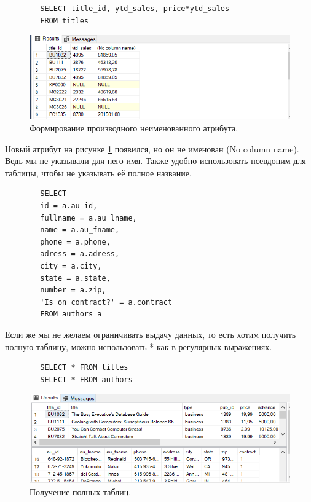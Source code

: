 \begin{verbatim}
        SELECT title_id, ytd_sales, price*ytd_sales
        FROM titles
\end{verbatim}
\begin{figure}
    \centering
    \includegraphics[width=0.9\linewidth]{Pic/lab4/SQL6.PNG}
    \caption{Формирование производного неименованного атрибута.}
    \label{fig:CatribNo}
\end{figure}

Новый атрибут на рисунке \ref{fig:CatribNo} появился, но он не именован (No column name). Ведь мы не указывали для него имя. Также удобно использовать псевдоним для таблицы, чтобы не указывать её полное название.

\begin{verbatim}
        SELECT 
        id = a.au_id, 
        fullname = a.au_lname, 
        name = a.au_fname,
        phone = a.phone,
        adress = a.adress,
        city = a.city,
        state = a.state,
        number = a.zip,
        'Is on contract?' = a.contract
        FROM authors a
\end{verbatim}

Если же мы не желаем ограничивать выдачу данных, то есть хотим получить полную таблицу, можно использовать * как в регулярных выражениях. 

\begin{verbatim}
        SELECT * FROM titles
        SELECT * FROM authors
\end{verbatim}

\begin{figure}[h!]
    \centering
    \includegraphics[width=0.9\linewidth]{Pic/lab4/SQ7.PNG}
    \caption{Получение полных таблиц.}
    \label{fig:ALLDATA}
\end{figure}

